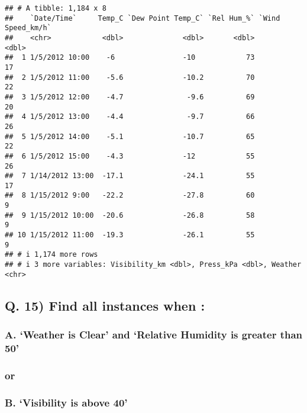 \documentclass[
]{article}
\begin{document}
\begin{verbatim}
## # A tibble: 1,184 x 8
##    `Date/Time`     Temp_C `Dew Point Temp_C` `Rel Hum_%` `Wind Speed_km/h`
##    <chr>            <dbl>              <dbl>       <dbl>             <dbl>
##  1 1/5/2012 10:00    -6                -10            73                17
##  2 1/5/2012 11:00    -5.6              -10.2          70                22
##  3 1/5/2012 12:00    -4.7               -9.6          69                20
##  4 1/5/2012 13:00    -4.4               -9.7          66                26
##  5 1/5/2012 14:00    -5.1              -10.7          65                22
##  6 1/5/2012 15:00    -4.3              -12            55                26
##  7 1/14/2012 13:00  -17.1              -24.1          55                17
##  8 1/15/2012 9:00   -22.2              -27.8          60                 9
##  9 1/15/2012 10:00  -20.6              -26.8          58                 9
## 10 1/15/2012 11:00  -19.3              -26.1          55                 9
## # i 1,174 more rows
## # i 3 more variables: Visibility_km <dbl>, Press_kPa <dbl>, Weather <chr>
\end{verbatim}

\hypertarget{q.-15-find-all-instances-when}{%
\subsection{Q. 15) Find all instances when
:}\label{q.-15-find-all-instances-when}}

\hypertarget{a.-weather-is-clear-and-relative-humidity-is-greater-than-50}{%
\subsubsection{A. `Weather is Clear' and `Relative Humidity is greater
than
50'}\label{a.-weather-is-clear-and-relative-humidity-is-greater-than-50}}

\hypertarget{or}{%
\subsubsection{or}\label{or}}

\hypertarget{b.-visibility-is-above-40}{%
\subsubsection{B. `Visibility is above
40'}\label{b.-visibility-is-above-40}}
\end{document}
